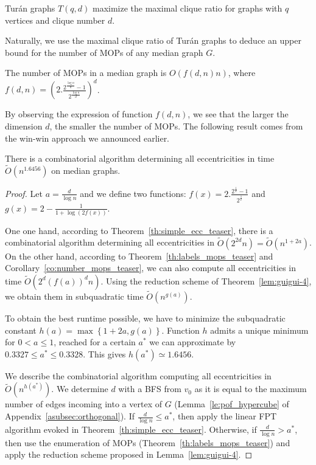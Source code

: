 \documentclass[a4paper,UKenglish,numberwithinsect,cleveref, autoref,anonymous]{lipics-v2021}
\newcommand{\set}[1]{\left\{ #1 \right\}}
\begin{document}
\begin{theorem}[\ref{th:turan}]
Tur\'an graphs $T(q,d)$ maximize the maximal clique ratio for graphs with $q$ vertices and clique number $d$.
\label{th:turan_teaser}
\end{theorem}

Naturally, we use the maximal clique ratio of Tur\'an graphs to deduce an upper bound for the number of MOPs of any median graph $G$.

\begin{corollary}[\ref{co:number_mops}]
The number of MOPs in a median graph is $O(f(d,n)n)$, where $f(d,n) = \left(2.\frac{2^{\frac{\log n}{d}}-1}{2^{\frac{\log n}{d}}}\right)^d$.
\label{co:number_mops_teaser}
\end{corollary}

By observing the expression of function $f(d,n)$, we see that the larger the dimension $d$, the smaller the number of MOPs. The following result comes from the win-win approach we announced earlier.

\begin{theorem}
There is a combinatorial algorithm determining all eccentricities in time $\tilde{O}(n^{1.6456})$ on median graphs.
\label{th:subquadramop}
\end{theorem}
\begin{proof}
Let $a = \frac{d}{\log n}$ and we define two functions: $f(x) = 2.\frac{2^{\frac{1}{x}}-1}{2^{\frac{1}{x}}}$ and $g(x) = 2-\frac{1}{1+\log (2f(x))}$.

One one hand, according to Theorem~\ref{th:simple_ecc_teaser}, there is a combinatorial algorithm determining all eccentricities in $\tilde{O}(2^{2d}n) = \tilde{O}(n^{1+2a})$. 
On the other hand, according to Theorem~\ref{th:labels_mops_teaser} and Corollary~\ref{co:number_mops_teaser}, we can also compute all eccentricities in time $\tilde{O}(2^d(f(a))^dn)$. Using the reduction scheme of Theorem~\ref{lem:guigui-4}, we obtain them in subquadratic time $\tilde{O}(n^{g(a)})$.

To obtain the best runtime possible, we have to minimize the subquadratic constant $h(a) =\max \set{1+2a,g(a)}$. Function $h$ admits a unique minimum for $0 < a \le 1$, reached for a certain $a^*$ we can approximate by $0.3327 \le a^* \le 0.3328$. This gives $h(a^*) \simeq 1.6456$.

We describe the combinatorial algorithm computing all eccentricities in $\tilde{O}(n^{h(a^*)})$. We determine $d$ with a BFS from $v_0$ as it is equal to the maximum number of edges incoming into a vertex of $G$ (Lemma~\ref{le:pof_hypercube} of Appendix~\ref{asubsec:orthogonal}).
If $\frac{d}{\log n} \le a^*$, then apply the linear FPT algorithm evoked in Theorem~\ref{th:simple_ecc_teaser}. Otherwise, if $\frac{d}{\log n} > a^*$, then use the enumeration of MOPs (Theorem~\ref{th:labels_mops_teaser}) and apply the reduction scheme proposed in Lemma~\ref{lem:guigui-4}.
\end{proof}
\end{document}
